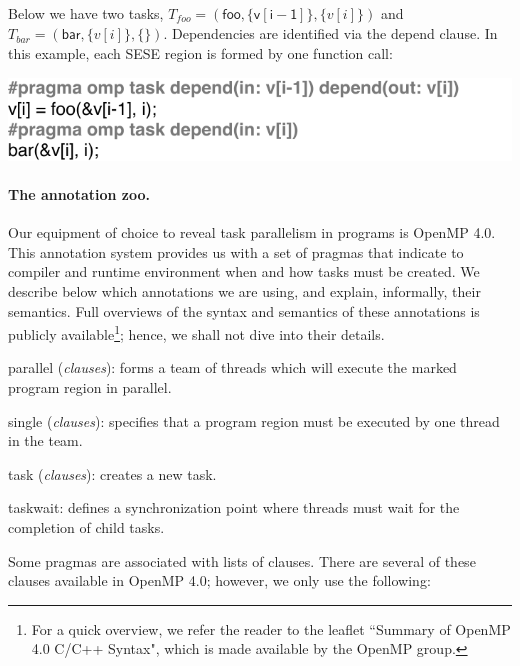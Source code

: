 \documentclass[sigplan,10pt,review,anonymous]{acmart}
\begin{document}
\begin{example}
\label{ex:regions}
Below we have two tasks, $T_{\mathit{foo}} = (\mathsf{foo}, \{\mathsf{v[i - 1]}\},
\{v[i]\})$ and $T_{\mathit{bar}} = (\mathsf{bar}, \{v[i]\}, \{\})$.
Dependencies are identified via the \textsf{depend} clause.
In this example, each SESE region is formed by one function call:
\end{example}

\includegraphics[width=1\columnwidth]{images/ex_depends}

\paragraph{The annotation zoo.}
Our equipment of choice to reveal task parallelism in programs is OpenMP 4.0.
This annotation system provides us with a set of pragmas that indicate to compiler
and runtime environment when and how tasks must be created.
We describe below which annotations we are using, and explain, informally, their
semantics.
Full overviews of the syntax and semantics of these annotations is publicly
available\footnote{For a quick overview, we refer the reader to the leaflet
``Summary of OpenMP 4.0 C/C++ Syntax", which is made available by the OpenMP
group.}; hence, we shall not dive into their details.
%
\begin{compactitem}
\item \textsf{parallel} (\textit{clauses}): forms a team of threads
which will execute the marked program region in parallel.
\item \textsf{single} (\textit{clauses}): specifies that a
program region must be executed by one thread in the team.
\item \textsf{task} (\textit{clauses}): creates a new task.
\item \textsf{taskwait}: defines a synchronization point where
threads must wait for the completion of child tasks.
\end{compactitem}
%
Some pragmas are associated with lists of clauses.
There are several of these clauses available in OpenMP 4.0; however, we only use
the following:
\end{document}

